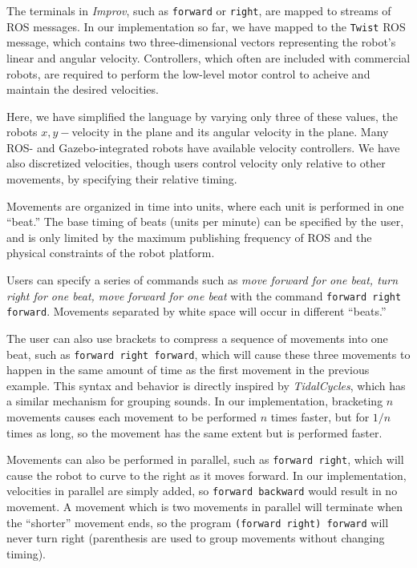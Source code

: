 \documentclass[sigconf]{acmart}
\begin{document}
The terminals in \emph{Improv}, such as \texttt{forward} or
\texttt{right}, are mapped to streams of ROS messages. In our
implementation so far, we have mapped to the \texttt{Twist} ROS message,
which contains two three-dimensional vectors
representing the robot's linear and angular velocity. Controllers, which often
are included with commercial robots, are required to perform the low-level motor
control to acheive and maintain the desired velocities.

Here, we have simplified the language
by varying only three of these values, the robots \(x,y-\)velocity in
the plane and its angular velocity in the plane. Many ROS- and
Gazebo-integrated robots have available velocity controllers. We have
also discretized velocities, though users control velocity only relative
to other movements, by specifying their relative timing.

Movements are organized in time into units, where each unit is performed in one
``beat.'' The base timing of beats (units per minute) can be specified by the
user, and is only limited by the maximum publishing frequency of ROS and the
physical constraints of the robot platform.

Users can specify a series of commands such as \emph{move forward for
one beat, turn right for one beat, move forward for one beat} with the
command \texttt{forward right forward}. Movements separated by white
space will occur in different ``beats.''

The user can also use brackets to compress a sequence of movements into
one beat, such as \texttt{forward right forward}, which will
cause these three movements to happen in the same amount of time as the
first movement in the previous example. This syntax and behavior is directly 
inspired by \emph{TidalCycles}, which has a similar mechanism for grouping
sounds. In our implementation,
bracketing $n$ movements causes each movement to be performed $n$
times faster, but for $1/n$ times as long, so the movement has the
same extent but is performed faster.

Movements can also be performed in parallel, such as
\texttt{forward \textbar{}\textbar{} right}, which will cause the
robot to curve to the right as it moves forward. In our implementation,
velocities in parallel are simply added, so
\texttt{forward \textbar{}\textbar{} backward} would result in no
movement. A movement which is two movements in parallel will terminate
when the ``shorter'' movement ends, so the program
\texttt{(forward right) \textbar{}\textbar{} forward} will never turn
right (parenthesis are used to group movements without changing timing).
\end{document}
